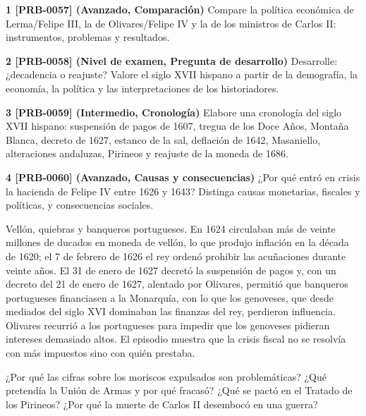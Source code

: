 \documentclass{book}
\begin{document}
\begin{tcolorbox}[title={Ejercicios}, studiumworked, breakable]

\noindent\textbf{1 [PRB-0057] (Avanzado, Comparación)}
Compare la política económica de Lerma/Felipe III, la de Olivares/Felipe IV y la de los ministros de Carlos II: instrumentos, problemas y resultados.


\noindent\textbf{2 [PRB-0058] (Nivel de examen, Pregunta de desarrollo)}
Desarrolle: ¿decadencia o reajuste? Valore el siglo XVII hispano a partir de la demografía, la economía, la política y las interpretaciones de los historiadores.


\noindent\textbf{3 [PRB-0059] (Intermedio, Cronología)}
Elabore una cronología del siglo XVII hispano: suspensión de pagos de 1607, tregua de los Doce Años, Montaña Blanca, decreto de 1627, estanco de la sal, deflación de 1642, Masaniello, alteraciones andaluzas, Pirineos y reajuste de la moneda de 1686.


\noindent\textbf{4 [PRB-0060] (Avanzado, Causas y consecuencias)}
¿Por qué entró en crisis la hacienda de Felipe IV entre 1626 y 1643? Distinga causas monetarias, fiscales y políticas, y consecuencias sociales.

\end{tcolorbox}

\begin{tcolorbox}[title={Autoficha}, studiumcheck, breakable]

Vellón, quiebras y banqueros portugueses. En 1624 circulaban más de veinte millones de ducados en moneda de vellón, lo que produjo inflación en la década de 1620; el 7 de febrero de 1626 el rey ordenó prohibir las acuñaciones durante veinte años. El 31 de enero de 1627 decretó la suspensión de pagos y, con un decreto del 21 de enero de 1627, alentado por Olivares, permitió que banqueros portugueses financiasen a la Monarquía, con lo que los genoveses, que desde mediados del siglo XVI dominaban las finanzas del rey, perdieron influencia. Olivares recurrió a los portugueses para impedir que los genoveses pidieran intereses demasiado altos. El episodio muestra que la crisis fiscal no se resolvía con más impuestos sino con quién prestaba.


¿Por qué las cifras sobre los moriscos expulsados son problemáticas? ¿Qué pretendía la Unión de Armas y por qué fracasó? ¿Qué se pactó en el Tratado de los Pirineos? ¿Por qué la muerte de Carlos II desembocó en una guerra?

\end{tcolorbox}
\end{document}

